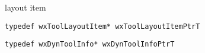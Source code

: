%
%


\section{}\label{wxtoollayoutitem}


layout item




{\small \begin{verbatim}
typedef wxToolLayoutItem* wxToolLayoutItemPtrT
\end{verbatim}}

{\small \begin{verbatim}
typedef wxDynToolInfo* wxDynToolInfoPtrT
\end{verbatim}}

